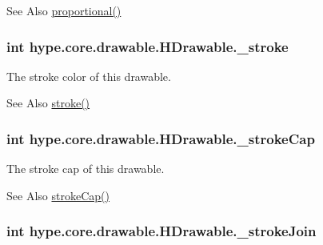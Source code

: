 \begin{DoxySeeAlso}{See Also}
\hyperlink{classhype_1_1core_1_1drawable_1_1_h_drawable_a220999f7d54e04a47ad0509d349a2bdd}{proportional()} 
\end{DoxySeeAlso}
\hypertarget{classhype_1_1core_1_1drawable_1_1_h_drawable_aa773c8e474774a4f4b6437f77abdc85b}{
\subsubsection[{\-\_\-stroke}]{\setlength{\rightskip}{0pt plus 5cm}int hype.\-core.\-drawable.\-H\-Drawable.\-\_\-stroke\hspace{0.3cm}{\ttfamily [protected]}}}\label{classhype_1_1core_1_1drawable_1_1_h_drawable_aa773c8e474774a4f4b6437f77abdc85b}


The stroke color of this drawable. 

\begin{DoxySeeAlso}{See Also}
\hyperlink{classhype_1_1core_1_1drawable_1_1_h_drawable_aeef1c190f383562910107be8e5f80461}{stroke()} 
\end{DoxySeeAlso}
\hypertarget{classhype_1_1core_1_1drawable_1_1_h_drawable_a35be29f7a889fada5549c5dfcaa98d7d}{
\subsubsection[{\-\_\-stroke\-Cap}]{\setlength{\rightskip}{0pt plus 5cm}int hype.\-core.\-drawable.\-H\-Drawable.\-\_\-stroke\-Cap\hspace{0.3cm}{\ttfamily [protected]}}}\label{classhype_1_1core_1_1drawable_1_1_h_drawable_a35be29f7a889fada5549c5dfcaa98d7d}


The stroke cap of this drawable. 

\begin{DoxySeeAlso}{See Also}
\hyperlink{classhype_1_1core_1_1drawable_1_1_h_drawable_ab9838a263f6daf6cc85f4fc7f7e038e2}{stroke\-Cap()} 
\end{DoxySeeAlso}
\hypertarget{classhype_1_1core_1_1drawable_1_1_h_drawable_a3b021f60cc0552c6d1c5d4e298419dec}{
\subsubsection[{\-\_\-stroke\-Join}]{\setlength{\rightskip}{0pt plus 5cm}int hype.\-core.\-drawable.\-H\-Drawable.\-\_\-stroke\-Join\hspace{0.3cm}{\ttfamily [protected]}}}\label{classhype_1_1core_1_1drawable_1_1_h_drawable_a3b021f60cc0552c6d1c5d4e298419dec}


